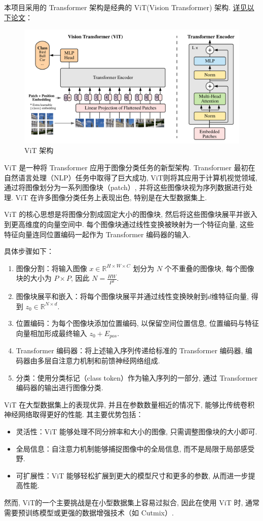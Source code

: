 \documentclass[notitlepage,cs4size,punct,oneside]{ctexrep}
\numberwithin{equation}{chapter}
\theoremstyle{mystyle}
\begin{document}
本项目采用的 Transformer 架构是经典的 ViT(Vision Transformer) 架构. \href{https://arxiv.org/pdf/2010.11929.pdf?fbclid=IwAR1NafJDhZjkARvCswpV6kS9_hMa0ycvzwhlCb7cqAGwgzComFXcScxgA8o}{详见以下论文}：
\begin{figure}[H]
    \centering
    \includegraphics[scale=0.55]{ViT.png}
    \caption{ViT 架构}
\end{figure}
ViT 是一种将 Transformer 应用于图像分类任务的新型架构. Transformer 最初在自然语言处理（NLP）任务中取得了巨大成功, ViT则将其应用于计算机视觉领域, 通过将图像划分为一系列图像块（patch）, 并将这些图像块视为序列数据进行处理. ViT 在许多图像分类任务上表现出色, 特别是在大型数据集上.

ViT 的核心思想是将图像分割成固定大小的图像块, 然后将这些图像块展平并嵌入到更高维度的向量空间中. 每个图像块通过线性变换被映射为一个特征向量, 这些特征向量连同位置编码一起作为 Transformer 编码器的输入.

具体步骤如下：
\begin{enumerate}
    \item 图像分割：将输入图像 $x \in \mathbb{R}^{H \times W \times C}$ 划分为 $N$ 个不重叠的图像块, 每个图像块的大小为 $P \times P$, 因此 $N = \frac{HW}{P^2}$.
    \item 图像块展平和嵌入：将每个图像块展平并通过线性变换映射到$d$维特征向量, 得到 $z_0 \in \mathbb{R}^{N \times d}$.
    \item 位置编码：为每个图像块添加位置编码, 以保留空间位置信息, 位置编码与特征向量相加形成最终输入 $z_0 + E_{pos}$.
    \item Transformer 编码器：将上述输入序列传递给标准的 Transformer 编码器, 编码器由多层自注意力机制和前馈神经网络组成.
    \item 分类：使用分类标记（class token）作为输入序列的一部分, 通过 Transformer 编码器的输出进行图像分类.
\end{enumerate}
ViT 在大型数据集上的表现优异, 并且在参数数量相近的情况下, 能够比传统卷积神经网络取得更好的性能. 其主要优势包括：
\begin{itemize}
    \item 灵活性：ViT 能够处理不同分辨率和大小的图像, 只需调整图像块的大小即可.
    \item 全局信息：自注意力机制能够捕捉图像中的全局信息, 而不是局限于局部感受野.
    \item 可扩展性：ViT 能够轻松扩展到更大的模型尺寸和更多的参数, 从而进一步提高性能.
\end{itemize}
然而, ViT的一个主要挑战是在小型数据集上容易过拟合, 因此在使用 ViT 时, 通常需要预训练模型或更强的数据增强技术（如 Cutmix）.
\end{document}
